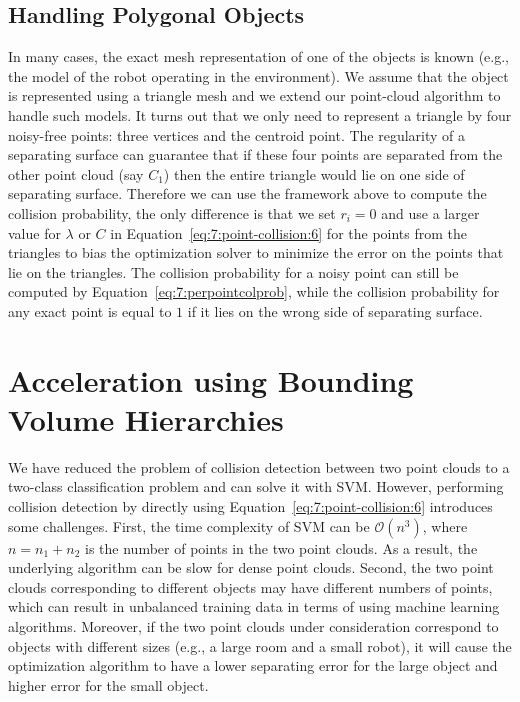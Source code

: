 \subsection{Handling Polygonal Objects}
In many cases, the exact mesh representation of one of the objects is known (e.g., the model of the robot operating in the environment).
We assume that the object is represented using a triangle mesh and we extend our point-cloud algorithm to handle such models.
It turns out that we only need to represent a triangle by four noisy-free points: three vertices and the centroid point.
The regularity of a separating surface can guarantee that if these four points are separated from the other point cloud (say $C_1$)
then the entire triangle would lie on one side of separating surface.
Therefore we can use the framework above to compute the collision probability, the only difference is that we
set $r_i = 0$ and use a larger value for $\lambda$ or $C$ in Equation~\ref{eq:7:point-collision:6} for the points from the triangles to bias
the optimization solver to minimize the error on  the points that lie on the triangles. The collision probability for a noisy point
can still be computed by Equation~\ref{eq:7:perpointcolprob}, while the collision probability for any exact point is equal to
$1$ if it lies on the wrong side of separating surface.


\section{Acceleration using Bounding Volume Hierarchies}
\label{sec:7:bvh}


We have reduced the problem of collision detection between two point clouds to a two-class classification problem and can solve it with SVM. However, performing
collision detection by directly using Equation~\ref{eq:7:point-collision:6} introduces some challenges. First, the time complexity of SVM can be $\mathcal O(n^3)$,
where $n = n_1 + n_2$ is the number of points in the two point clouds. As a result, the underlying algorithm can be slow for dense point clouds.
Second, the two point clouds corresponding to different objects may have different numbers of points, which can result in unbalanced training data in terms
of using machine learning algorithms.
Moreover, if the two point clouds under consideration correspond to objects with different sizes (e.g., a large room and a small robot), it will cause the optimization algorithm to have a lower separating error for the large object and higher error for the small object.

